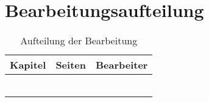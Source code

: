 \section{Bearbeitungsaufteilung}

\begin{table}[h]
	\caption*{Aufteilung der Bearbeitung}
	\begin{center}
		\begin{tabular}{l|l|l}
			Kapitel & Seiten & Bearbeiter \\
			\hline
			\hline
			&  &  \\
			&  &  \\
			&  &  \\
			&  &  \\
			&  &  \\
			&  &  \\
			\hline
		\end{tabular}
	\end{center}
\end{table}